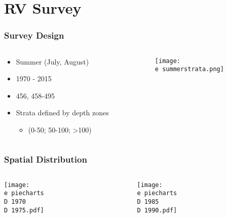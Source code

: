 \documentclass{beamer}
\begin{document}
\section{RV Survey}
\begin{frame}
\frametitle{Survey Design}
\begin{columns}
	\begin{column}{.35\textwidth}
		\begin{block}

			\begin{itemize}
				\item Summer (July, August)
				\item 1970 - 2015
				\item 456, 458-495
				\item Strata defined by depth zones 
				\begin{itemize}
				\item(0-50; 50-100; \textgreater 100)
				\end{itemize}
			\end{itemize}

\end{block}
\end{column}

\begin{column}{0.48\textwidth}
\begin{figure}

 \centerline{\texttt{[image: \\e summerstrata.png]}}

 \end{figure}
 \end{column}
 \end{columns}
\end{frame}


\begin{frame}
\frametitle{Spatial Distribution}
\begin{columns}
	\begin{column}{.48\textwidth}
		\centerline{\texttt{[image: \\e piecharts\\D 1970\\D 1975.pdf]}}
	\end{column}

	\begin{column}{0.48\textwidth}
	\begin{figure}

 		\centerline{\texttt{[image: \\e piecharts\\D 1985\\D 1990.pdf]}}

 \end{figure}
 \end{column}
 \end{columns}
\end{frame}
\end{document}
